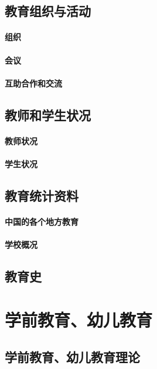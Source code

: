 \documentclass[UTF8]{../../ApplicationUniverse}
\begin{document}
\section{教育组织与活动}
    \subsubsection{组织}
    \subsubsection{会议}
    \subsubsection{互助合作和交流}
\section{教师和学生状况}
    \subsubsection{教师状况}
    \subsubsection{学生状况}
\section{教育统计资料}


\subsubsection{中国的各个地方教育}
\subsubsection{学校概况}

\section{教育史}





\chapter{学前教育、幼儿教育}
\section{学前教育、幼儿教育理论}
\end{document}
